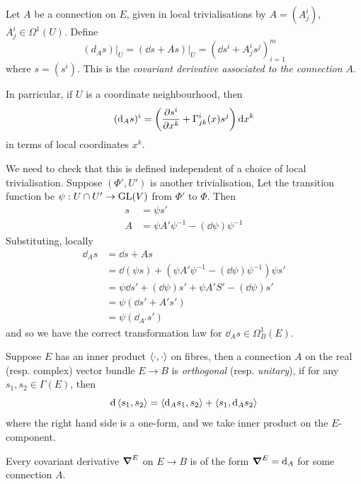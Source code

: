 \documentclass{article}
\begin{document}
\begin{example}
    Let \(A\) be a connection on \(E\), given in local trivialisations by \(A = (A^i_j)\), \(A^i_j \in \Omega^1(U)\). Define
    \[(d_As)\vert_U = (\dd s + As)\vert_U = (\dd s^i + A^i_j s^j)_{i=1}^m\]
    where \(s = (s^i)\). This is the \emph{covariant derivative associated to the connection \(A\)}.

    In parricular, if \(U\) is a coordinate neighbourhood, then
    \[(\dd_As)^i = \left(\pdv{s^i}{x^k} + \Gamma^i_{jk}(x)s^j\right)\dd x^k\]
    in terms of local coordinates \(x^k\).

    We need to check that this is defined independent of a choice of local trivialisation. Suppose \((\Phi', U')\) is another trivialisation, Let the transition function be \(\psi : U \cap U' \to \operatorname{GL}(V)\) from \(\Phi'\) to \(\Phi\). Then
    \begin{align*}
        s &= \psi s' \\
        A &= \psi A' \psi^{-1} - (\dd \psi)\psi^{-1}
    \end{align*}
    Substituting, locally
    \begin{align*}
        \dd_As &= \dd s + As \\
        &= \dd (\psi s) + (\psi A' \psi^{-1} - (\dd \psi)\psi^{-1})\psi s' \\
        &= \psi \dd s' + (\dd \psi)s' + \psi A' S' - (\dd \psi)s' \\
        &= \psi(\dd s' + A's') \\
        &= \psi(\dd_{A'}s')
    \end{align*}
    and so we have the correct transformation law for \(\dd_A s \in \Omega^1_B(E)\).
\end{example}

Suppose \(E\) has an inner product \(\left\langle \cdot, \cdot \right\rangle\) on fibres, then a connection \(A\) on the real (resp. complex) vector bundle \(E \to B\) is \emph{orthogonal} (resp. \emph{unitary}), if for any \(s_1, s_2 \in \Gamma(E)\), then
\[\dd \left\langle s_1, s_2 \right\rangle = \left\langle \dd_A s_1, s_2 \right\rangle + \left\langle s_1, \dd_A s_2 \right\rangle\]
where the right hand side is a one-form, and we take inner product on the \(E\)-component.

\begin{theorem}
    Every covariant derivative \(\grad^E\) on \(E \to B\) is of the form \(\grad^E = \dd_A \) for some connection \(A\).
\end{theorem}
\end{document}
